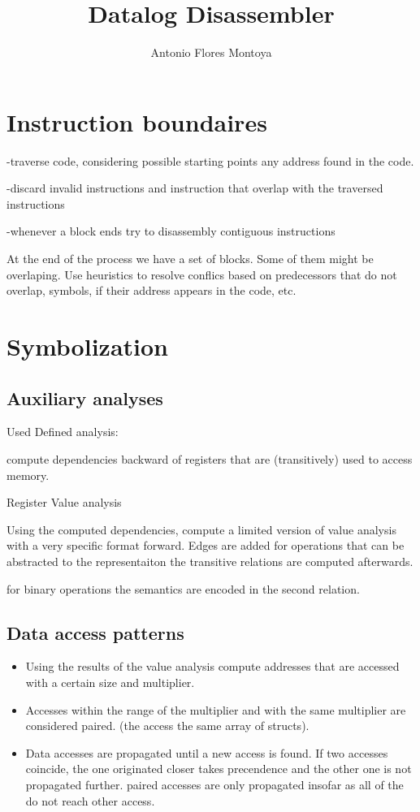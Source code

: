\documentclass[]{llncs}
\author{Antonio Flores Montoya}
\title{Datalog Disassembler}
\begin{document}
\maketitle

\section{Instruction boundaires}
-traverse code, considering possible starting points any address found in the code.

-discard invalid instructions and instruction that overlap with the traversed
instructions

-whenever a block ends try to disassembly contiguous instructions

At the end of the process we have a set of blocks. Some of them might be overlaping.
Use heuristics to resolve conflics
based on predecessors that do not overlap, symbols, if their address appears in the code,
etc.


\section{Symbolization}
\subsection{Auxiliary analyses}
Used Defined analysis:

compute dependencies backward of registers that are (transitively) used to access
memory.


Register Value analysis

Using the computed dependencies, compute a limited version of value analysis with a
very specific format forward.
Edges are added for operations that can be abstracted to the representaiton
the transitive relations are computed afterwards.

for binary operations the semantics are encoded in the second relation.



\subsection{Data access patterns}
\begin{itemize}
\item Using the results of the value analysis compute addresses that are accessed with
a certain size and multiplier.
\item Accesses within the range of the multiplier and with the same multiplier are considered
paired. (the access the same array of structs).
\item Data accesses are propagated until a new access is found.
If two accesses coincide, the one originated closer takes precendence and the
other one is not propagated further.
paired accesses are only propagated insofar as all of the do not reach other access.
\end{itemize}
\end{document}
